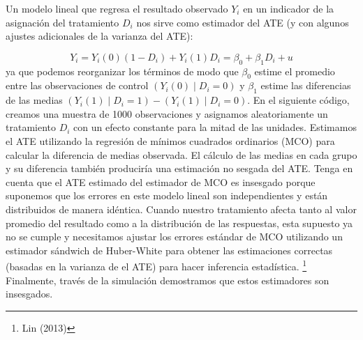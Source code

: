 \documentclass[
]{article}
\begin{document}
Un modelo lineal que regresa el resultado observado \(Y_ {i}\) en un
indicador de la asignación del tratamiento \(D_{i}\) nos sirve como
estimador del ATE (y con algunos ajustes adicionales de la varianza del
ATE):

\[Y_{i}=Y_{i}(0)(1-D_{i})+Y_{i}(1)D_{i}=\beta_{0}+\beta_{1}D_{i}+u\] ya
que podemos reorganizar los términos de modo que \(\beta_{0}\) estime el
promedio entre las observaciones de control \((Y_ {i} (0) ∣D_ {i} = 0)\)
y \(\beta_{1}\) estime las diferencias de las medias
\((Y_ {i} (1) ∣D_ {i} = 1) - (Y_ {i} (1) ∣D_ {i} = 0)\). En el siguiente
código, creamos una muestra de 1000 observaciones y asignamos
aleatoriamente un tratamiento \(D_i\) con un efecto constante para la
mitad de las unidades. Estimamos el ATE utilizando la regresión de
mínimos cuadrados ordinarios (MCO) para calcular la diferencia de medias
observada. El cálculo de las medias en cada grupo y su diferencia
también produciría una estimación no sesgada del ATE. Tenga en cuenta
que el ATE estimado del estimador de MCO es insesgado porque suponemos
que los errores en este modelo lineal son independientes y están
distribuidos de manera idéntica. Cuando nuestro tratamiento afecta tanto
al valor promedio del resultado como a la distribución de las
respuestas, esta supuesto ya no se cumple y necesitamos ajustar los
errores estándar de MCO utilizando un estimador sándwich de Huber-White
para obtener las estimaciones correctas (basadas en la varianza de el
ATE) para hacer inferencia estadística. \footnote{Lin (2013)}
Finalmente, través de la simulación demostramos que estos estimadores
son insesgados.
\end{document}
